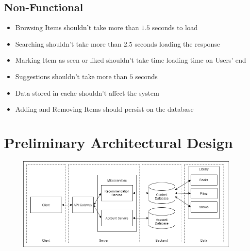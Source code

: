 \documentclass{article}
\begin{document}
  \subsection{Non-Functional}
    \begin{itemize}
      \item Browsing Items shouldn't take more than $1.5$ seconds to load
      \item Searching shouldn't take more than $2.5$ seconds loading the response
      \item Marking Item as seen or liked shouldn't take time loading time on Users' end
      \item Suggestions shouldn't take more than $5$ seconds
      \item Data stored in cache shouldn't affect the system
      \item Adding and Removing Items should persist on the database
    \end{itemize}

\section{Preliminary Architectural Design}
  \begin{figure}[H]
    \centering
    \includegraphics[width=\textwidth]{"images/CloudNativeAppArchitectureV1.png"}
  \end{figure}
\end{document}
